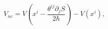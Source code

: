 \begin{equation}
V_{nc}=V\left(  x^{i}-\frac{\theta^{ij}\partial_{j}S}{2\hbar}\right)
-V\left(  x^{i}\right)  ,\label{16}%
\end{equation}%
